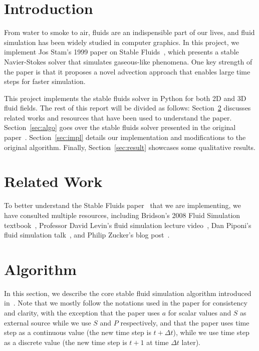 \documentclass[sigconf]{acmart}
\begin{document}
\maketitle

\section{Introduction}
From water to smoke to air, fluids are an indispensible part of our lives, and
fluid simulation has been widely studied in computer graphics. In this project,
we implement Jos Stam's 1999 paper on Stable Fluids~\cite{Stam1999Fluid}, which
presents a stable Navier-Stokes solver that simulates gaseous-like phenomena.
One key strength of the paper is that it proposes a novel advection approach
that enables large time steps for faster simulation.

This project implements the stable fluids solver in Python for both 2D and 3D fluid fields.
The rest of this report will be divided as follows: Section~\ref{sec:related}
discusses related works and resources that have been used to understand the paper.
Section~\ref{sec:algo} goes over the stable fluids solver presented in the original
paper~\cite{Stam1999Fluid}. Section~\ref{sec:impl} details our implementation and
modifications to the original algorithm. Finally, Section~\ref{sec:result} showcases
some qualitative results.

\section{Related Work}
\label{sec:related}
To better understand the Stable Fluids paper~\cite{Stam1999Fluid} that we are implementing, we have consulted multiple resources, including Bridson's 2008 Fluid Simulation textbook~\cite{Bridon2008FluidBook}, Professor David Levin's fluid simulation lecture video~\cite{csc417fluidvideo}, Dan Piponi's fluid simulation talk~\cite{piponitalk}, and Philip Zucker's blog post~\cite{zuckerblog}.

\section{Algorithm}
In this section, we describe the core stable fluid simulation algorithm introduced in~\cite{Stam1999Fluid}. Note that we mostly follow the notations used in the paper for consistency and clarity, with the exception that the paper uses $a$ for scalar values and $S$ as external source while we use $S$ and $P$ respectively, and that the paper uses time step as a continuous value (the new time step is $t + \Delta t$), while we use time step as a discrete value (the new time step is $t + 1$ at time $\Delta t$ later).
\label{sec:algo}
\end{document}
